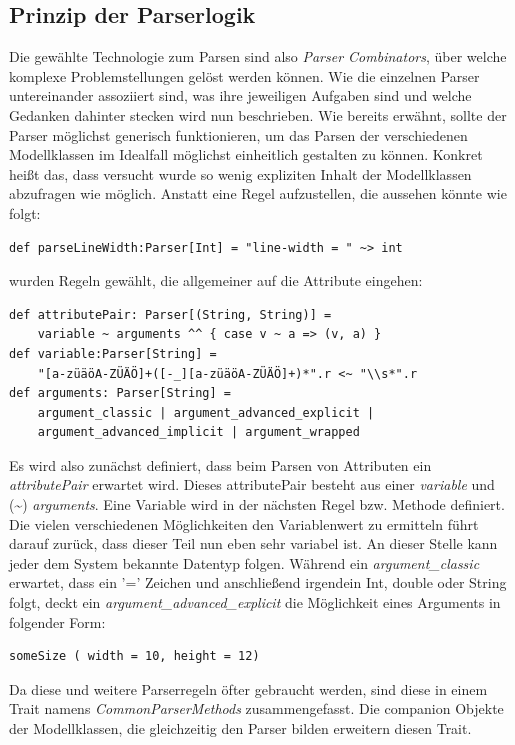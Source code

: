 \subsection{Prinzip der Parserlogik}Die gewählte Technologie zum Parsen sind also \textit{Parser Combinators}, über welche komplexe Problemstellungen gelöst werden können. Wie die einzelnen Parser untereinander assoziiert sind, was ihre jeweiligen Aufgaben sind und welche Gedanken dahinter stecken wird nun beschrieben.
Wie bereits erwähnt, sollte der Parser möglichst generisch funktionieren, um das Parsen der verschiedenen Modellklassen im Idealfall möglichst einheitlich gestalten zu können. Konkret heißt das, dass versucht wurde so wenig expliziten Inhalt der Modellklassen abzufragen wie möglich. Anstatt eine Regel aufzustellen, die aussehen könnte wie folgt:
\begin{lstlisting}[style=scala, aboveskip=0pt]
def parseLineWidth:Parser[Int] = "line-width = " ~> int
\end{lstlisting}
wurden Regeln gewählt, die allgemeiner auf die Attribute eingehen:
\begin{lstlisting}[style=scala]
def attributePair: Parser[(String, String)] = 
	variable ~ arguments ^^ { case v ~ a => (v, a) }
def variable:Parser[String] =
    "[a-züäöA-ZÜÄÖ]+([-_][a-züäöA-ZÜÄÖ]+)*".r <~ "\\s*".r
def arguments: Parser[String] =
    argument_classic | argument_advanced_explicit | 
    argument_advanced_implicit | argument_wrapped
\end{lstlisting}
Es wird also zunächst definiert, dass beim Parsen von Attributen ein \textit{attributePair} erwartet wird. Dieses attributePair besteht aus einer \textit{variable} und (\textasciitilde) \textit{arguments}. Eine Variable wird in der nächsten Regel bzw. Methode definiert.
Die vielen verschiedenen Möglichkeiten den Variablenwert zu ermitteln führt darauf zurück, dass dieser Teil nun eben sehr variabel ist. An dieser Stelle kann jeder dem System bekannte Datentyp folgen. Während ein \textit{argument\_classic} erwartet, dass ein '=' Zeichen und anschließend irgendein Int, double oder String folgt, deckt ein \textit{argument\_advanced\_explicit} die Möglichkeit eines Arguments in folgender Form:
\begin{lstlisting}[style=scala, aboveskip=0pt]
someSize ( width = 10, height = 12)
\end{lstlisting}Da diese und weitere Parserregeln öfter gebraucht werden, sind diese in einem Trait namens \textit{CommonParserMethods} zusammengefasst. Die companion Objekte der Modellklassen, die gleichzeitig den Parser bilden erweitern diesen Trait.
